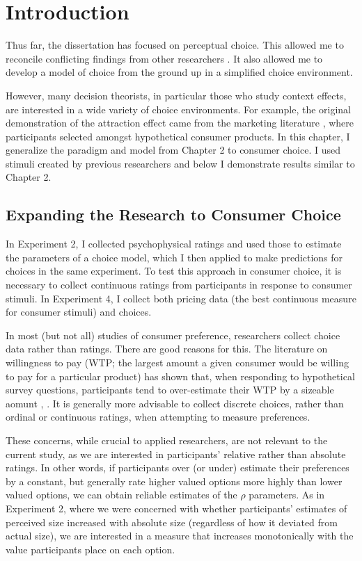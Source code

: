 \section{Introduction}
Thus far, the dissertation has focused on perceptual choice. This allowed me to reconcile conflicting findings from other researchers \parencite{spektorWhenGoodLooks2018b,trueblood2013not}. It also allowed me to develop a model of choice from the ground up in a simplified choice environment. 

However, many decision theorists, in particular those who study context effects, are interested in a wide variety of choice environments. For example, the original demonstration of the attraction effect came from the marketing literature \parencite{huberAddingAsymmetricallyDominated1982d}, where participants selected amongst hypothetical consumer products. In this chapter, I generalize the paradigm and model from Chapter 2 to consumer choice. I used stimuli created by previous researchers and below I demonstrate results similar to Chapter 2.

\subsection{Expanding the Research to Consumer Choice}

In Experiment 2, I collected psychophysical ratings and used those to estimate the parameters of a choice model, which I then applied to make predictions for choices in the same experiment. To test this approach in consumer choice, it is necessary to collect continuous ratings from participants in response to consumer stimuli. In Experiment 4, I collect both pricing data (the best continuous measure for consumer stimuli) and choices.

In most (but not all) studies of consumer preference, researchers collect choice data rather than ratings. There are good reasons for this. The literature on willingness to pay (WTP; the largest amount a given consumer would be willing to pay for a particular product) has shown that, when responding to hypothetical survey questions, participants tend to over-estimate their WTP by a sizeable aomunt \parencite{breidertREVIEWMETHODSMEASURING2006,schmidtAccuratelyMeasuringWillingness2020}, \parencite[c.f.~]{miller2011should}. It is generally more advisable to collect discrete choices, rather than ordinal or continuous ratings, when attempting to measure preferences.

These concerns, while crucial to applied researchers, are not relevant to the current study, as we are interested in participants' relative rather than absolute ratings. In other words, if participants over (or under) estimate their preferences by a constant, but generally rate higher valued options more highly than lower valued options, we can obtain reliable estimates of the $\rho$ parameters. As in Experiment 2, where we were concerned with whether participants' estimates of perceived size increased with absolute size (regardless of how it deviated from actual size), we are interested in a measure that increases monotonically with the value participants place on each option. 


